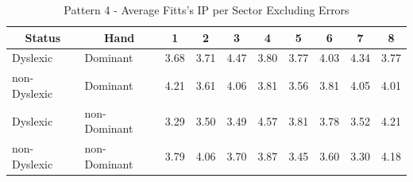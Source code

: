 	\begin{table}[h]
		\centering
		\caption{Pattern 4 - Average Fitts's IP per Sector Excluding Errors}
		\label{tab_pat_4_ip}
		\begin{tabularx}{\textwidth}{|l|l|X|X|X|X|X|X|X|X|}
			\hline
			\multicolumn{1}{|c|}{\textbf{Status}} & \multicolumn{1}{c|}{\textbf{Hand}} & \multicolumn{1}{c|}{\textbf{1}} & \multicolumn{1}{c|}{\textbf{2}} & \multicolumn{1}{c|}{\textbf{3}} & \multicolumn{1}{c|}{\textbf{4}} & \multicolumn{1}{c|}{\textbf{5}} & \multicolumn{1}{c|}{\textbf{6}} & \multicolumn{1}{c|}{\textbf{7}} & \multicolumn{1}{c|}{\textbf{8}} \\ \hline
			Dyslexic                              & Dominant                           & 3.68                            & 3.71                            & 4.47                            & 3.80                            & 3.77                            & 4.03                            & 4.34                            & 3.77                            \\ \hline
			non-Dyslexic                          & Dominant                           & 4.21                            & 3.61                            & 4.06                            & 3.81                            & 3.56                            & 3.81                            & 4.05                            & 4.01                            \\ \hline
			Dyslexic                              & non-Dominant                       & 3.29                            & 3.50                            & 3.49                            & 4.57                            & 3.81                            & 3.78                            & 3.52                            & 4.21                            \\ \hline
			non-Dyslexic                          & non-Dominant                       & 3.79                            & 4.06                            & 3.70                            & 3.87                            & 3.45                            & 3.60                            & 3.30                            & 4.18                            \\ \hline
		\end{tabularx}
	\end{table}		

